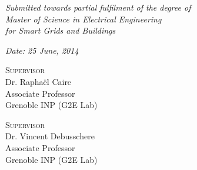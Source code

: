 \begin{center}
\vspace{0.25\parSepLength}

  \begin{minipage}{\textwidth}
    \centering
    \Large
    \textit{Submitted towards partial fulfilment of the degree of\\Master of Science in Electrical Engineering\\for Smart Grids and Buildings}

    \vspace{2\parSepLength}

    \normalsize\textit{Date: 25 June, 2014}
  \end{minipage}

  \vfill

  \begin{minipage}{0.8\textwidth}
    \centering
    \normalsize
    
    \begin{minipage}[t]{0.45\textwidth}
      \textsc{Supervisor} \\
      Dr. Rapha\"{e}l Caire\\
      Associate Professor\\ Grenoble INP (G2E Lab)
    \end{minipage}
    \hfill
    \begin{minipage}[t]{0.45\textwidth}
      \raggedleft
      \textsc{Supervisor} \\
      Dr. Vincent Debusschere\\
      Associate Professor\\ Grenoble INP (G2E Lab)
    \end{minipage}
  \end{minipage}
\end{center}
